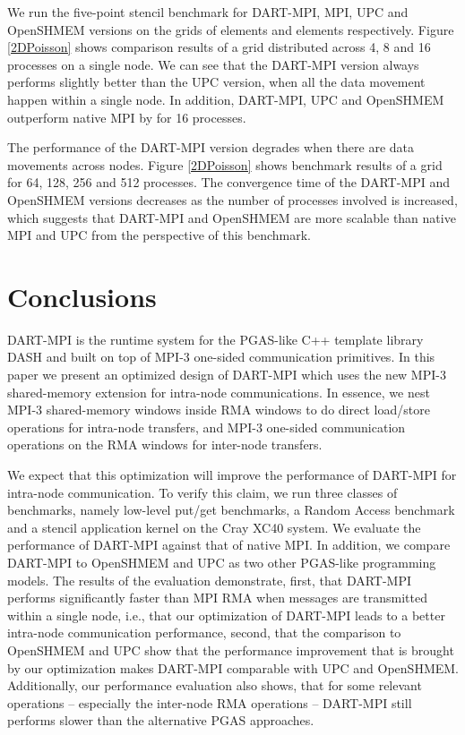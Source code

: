 \documentclass{llncs}
\newcommand{\MPI}[1]{\mbox{MPI-#1}\xspace}
\begin{document}
{We run the five-point stencil benchmark for \mbox{DART-MPI}, MPI, UPC and OpenSHMEM versions 
on the grids of  elements and 
elements respectively. Figure \ref{2DPoisson}\protect{} shows comparison results of a 
grid distributed across 4, 8 and 16 processes on a single node. We can
see that the \mbox{DART-MPI}
version always performs slightly better than the UPC version,
when all the data movement happen within a single node. In addition,
\mbox{DART-MPI}, UPC and OpenSHMEM outperform native MPI by 
 for 16 processes.

The performance of the \mbox{DART-MPI} version degrades when there are data movements across nodes. 
Figure \ref{2DPoisson}\protect{} shows benchmark results
of a  grid for 64, 128, 256 and 512 processes. The convergence time
of the DART-MPI and OpenSHMEM versions decreases as the 
number of processes involved is increased, which suggests that DART-MPI and OpenSHMEM 
are more scalable than native MPI and UPC from the perspective of this 
benchmark.




\section {Conclusions}
\label {conclusion}
DART-MPI is the runtime system for the PGAS-like C++ template library
DASH and built on top of \MPI3
one-sided communication primitives. In this paper we present an
optimized design of DART-MPI which uses the new \MPI3 shared-memory
extension for intra-node communications. In essence, we nest \MPI3
shared-memory windows inside RMA windows to do direct load/store
operations for intra-node transfers, and
\MPI3 one-sided communication operations on the RMA windows for
inter-node transfers. 

We expect that this optimization will improve the performance of
DART-MPI for intra-node communication. To verify this claim, we run
three classes of benchmarks, namely low-level put/get benchmarks, a
Random Access benchmark and a stencil application kernel
on the Cray XC40 system. We evaluate 
the performance of DART-MPI against that of native MPI. In addition, we compare DART-MPI to
OpenSHMEM and UPC as two other PGAS-like programming
models. The results of the
evaluation demonstrate, 
first, that DART-MPI performs significantly
faster than MPI RMA when messages are transmitted within a single
node, i.e., that our optimization of DART-MPI leads to a better intra-node 
communication performance, second, that the comparison to OpenSHMEM and UPC show that
the performance improvement that is brought by our optimization makes DART-MPI
comparable with UPC and OpenSHMEM. Additionally, our performance evaluation also shows, that for some
relevant operations -- especially the inter-node RMA operations --
DART-MPI still performs slower than the alternative PGAS approaches.

}
\end{document}
